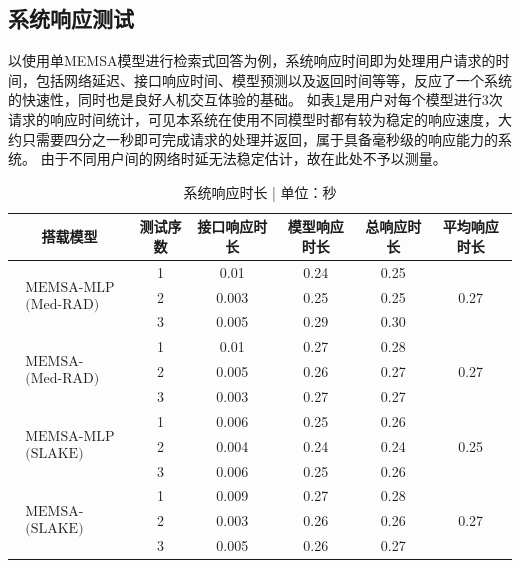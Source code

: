 \subsection{系统响应测试}
以使用单MEMSA模型进行检索式回答为例，系统响应时间即为处理用户请求的时间，包括网络延迟、接口响应时间、模型预测以及返回时间等等，反应了一个系统的快速性，同时也是良好人机交互体验的基础。
如表\ref{tab:timerep}是用户对每个模型进行3次请求的响应时间统计，可见本系统在使用不同模型时都有较为稳定的响应速度，大约只需要四分之一秒即可完成请求的处理并返回，属于具备毫秒级的响应能力的系统。
由于不同用户间的网络时延无法稳定估计，故在此处不予以测量。
\begin{table}
	\caption{\label{tab:timerep}系统响应时长 | 单位：秒}
	\centering
	\small
	\begin{tabular}{c|c|c|c|c|c}
		\hline 搭载模型 & 测试序数 & 接口响应时长 & 模型响应时长 & 总响应时长 & 平均响应时长 \\
		\hline \multirow{3}{*}{$\begin{array}{l}\text { MEMSA-MLP } \\
		\text { (Med-RAD) }\end{array}$} & 1 & 0.01 & 0.24 & 0.25 & \multirow{3}{*}{0.27} \\
		& 2 & 0.003 & 0.25 & 0.25 & \\
		& 3 & 0.005 & 0.29 & 0.30 & \\
		\hline \multirow{3}{*}{$\begin{array}{l}\text { MEMSA-BMLP } \\
		\text { (Med-RAD) }\end{array}$} & 1 & 0.01 & 0.27 & 0.28 & \multirow{3}{*}{0.27} \\
		& 2 & 0.005 & 0.26 & 0.27 & \\
		& 3 & 0.003 & 0.27 & 0.27 & \\
		\hline \multirow{3}{*}{$\begin{array}{l}\text { MEMSA-MLP } \\
		\text { (SLAKE) }\end{array}$} & 1 & 0.006 & 0.25 & 0.26 & \multirow{3}{*}{0.25} \\
		& 2 & 0.004 & 0.24 & 0.24 & \\
		& 3 & 0.006 & 0.25 & 0.26 & \\
		\hline \multirow{3}{*}{$\begin{array}{l}\text { MEMSA-BMLP } \\
		\text { (SLAKE) }\end{array}$} & 1 & 0.009 & 0.27 & 0.28 & \multirow{3}{*}{0.27} \\
		& 2 & 0.003 & 0.26 & 0.26 & \\
		& 3 & 0.005 & 0.26 & 0.27 & \\
		\hline
	\end{tabular}
\end{table}	


